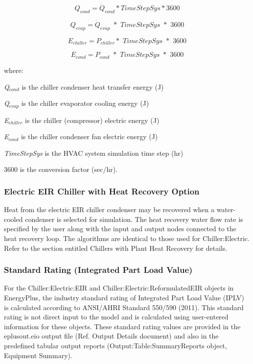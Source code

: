 \begin{equation}
{Q_{cond}} = {\dot{Q}_{cond}}*TimeStepSys*3600
\end{equation}

\begin{equation}
{Q_{evap}} = {\dot{Q}_{evap}}\,\,*\,\,TimeStepSys\,\,*\,\,3600
\end{equation}

\begin{equation}
{E_{chiller}} = {P_{chiller}}*\,\,TimeStepSys\,\,*\,\,3600
\end{equation}

\begin{equation}
{E_{cond}} = {P_{cond}}\,\, * \,\,TimeStepSys\,\,*\,\,3600
\end{equation}

where:

\emph{Q\(_{cond}\)} is the chiller condenser heat transfer energy (J)

\emph{Q\(_{evap}\)} is the chiller evaporator cooling energy (J)

\emph{E\(_{chiller}\)} is the chiller (compressor) electric energy (J)

\emph{E\(_{cond}\)} is the chiller condenser fan electric energy (J)

\emph{TimeStepSys} is the HVAC system simulation time step (hr)

\(3600\) is the conversion factor (sec/hr).

\subsubsection{Electric EIR Chiller with Heat Recovery Option}\label{electric-eir-chiller-with-heat-recovery-option}

Heat from the electric EIR chiller condenser may be recovered when a water-cooled condenser is selected for simulation. The heat recovery water flow rate is specified by the user along with the input and output nodes connected to the heat recovery loop. The algorithms are identical to those used for Chiller:Electric. Refer to the section entitled Chillers with Plant Heat Recovery for details.

\subsubsection{Standard Rating (Integrated Part Load Value)}\label{standard-rating-integrated-part-load-value}

For the Chiller:Electric:EIR and Chiller:Electric:ReformulatedEIR objects in EnergyPlus, the industry standard rating of Integrated Part Load Value (IPLV) is calculated according to ANSI/AHRI Standard 550/590 (2011). This standard rating is not direct input to the model and is calculated using user-entered information for these objects. These standard rating values are provided in the eplusout.eio output file (Ref. Output Details document) and also in the predefined tabular output reports (Output:Table:SummaryReports object, Equipment Summary).

